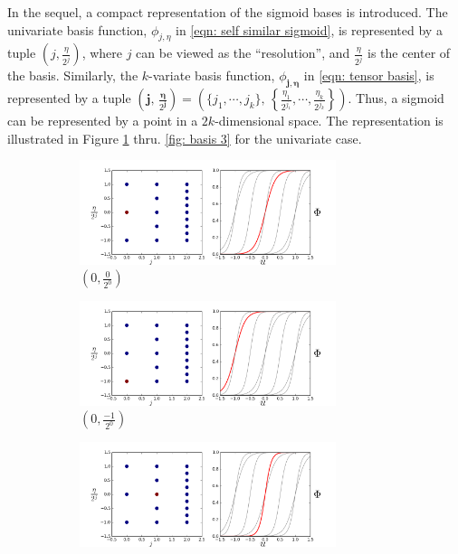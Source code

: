 In the sequel, a compact representation of the sigmoid bases is introduced.
The univariate basis function, $\phi_{j,\eta}$ in
\eqref{eqn: self similar sigmoid}, is represented by a tuple $(j, \frac{\eta}{2^j})$,
where $j$ can be viewed as the ``resolution'', and $\frac{\eta}{2^j}$ is
the center of the basis.
Similarly, the $k$-variate basis function, $\phi_{\boldsymbol{j}, \boldsymbol{\eta}}$ in
\eqref{eqn: tensor basis}, is represented by a tuple $\left(\boldsymbol{j}, \,
\frac{\boldsymbol{\eta}}{2^{\boldsymbol{j}}}\right) 
= \left(\{j_1,\cdots, j_k\}, \, \left\{\frac{\eta_1}{2^{j_1}}, \cdots, \frac{\eta_k}{2^{j_k}}\right\}\right)$.
Thus, a sigmoid can be represented by a point in a $2k$-dimensional space.
The representation is illustrated in Figure \ref{fig: basis 0} thru. \ref{fig: basis 3} 
for the univariate case.
\begin{figure}[htbp]\begin{center}
    \begin{subfigure}[t]{.48\textwidth}
        \centering
        \includegraphics[width=7.5cm]{../basis_0.png}
        \caption{$\left(0,\frac{0}{2^0}\right)$}
        \label{fig: basis 0}
    \end{subfigure}
    \begin{subfigure}[t]{.48\textwidth}
        \centering
        \includegraphics[width=7.5cm]{../basis_1.png}
        \caption{$\left(0, \frac{-1}{2^0}\right)$}
        \label{fig: basis 1}
    \end{subfigure}
    \begin{subfigure}[t]{.48\textwidth}
        \centering
        \includegraphics[width=7.5cm]{../basis_3.png}

\end{subfigure}
\end{center}
\end{figure}
